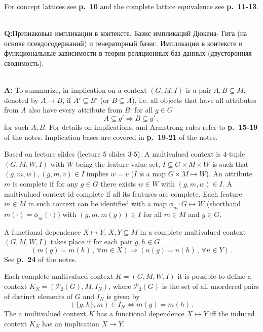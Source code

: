 \documentclass[a4paper,14pt]{extarticle}
\newcommand{\rus}[1]{\foreignlanguage{russian}{#1}}
\begin{document}
\noindent For concept lattices see \textbf{p.~10} and the complete lattice equivalence
see \textbf{p.~11-13}.

\hfill\\\textbf{Q:}\rus{Признаковые импликации в контексте. Базис импликаций Дюкена-
Гига (на основе псевдосодержаний) и генераторный базис. Импликации в контексте и
функциональные зависимости в теории реляционных баз данных (двусторонняя сводимость).}

\hfill\\\textbf{A:}
To summarize, in implication on a context $(G, M, I)$ is a pair $A, B\subseteq M$,
denoted by $A\to B$, if $A'\subseteq B'$ (or $B\subseteq  A$), i.e. all objects that
have all attributes from $A$ also have every attribute from $B$: for all $g\in G$
$$ A\subseteq g' \Rightarrow B \subseteq g'\,, $$
for such $A, B$. For details on implications, and Armstrong rules refer to \textbf{p.~15-19}
of the notes. Implication bases are covered in \textbf{p.~19-21} of the notes.

Based on lecture slides (lecture 5 slides 3-5). A multivalued context is $4$-tuple
$(G, M, W, I)$ with $W$ being the feature value set, $I\subseteq G\times M \times W$
is such that $(g,m,w), (g,m,v)\in I$ implies $w=v$ ($I$ is a map $G\times M\mapsto W$).
An attribute $m$ is complete if for any $g \in G$ there exists $w\in W$ with $(g,m,w)
\in I$. A multivalued context id complete if all its features are complete.
Each feature $m\in M$ in such context can be identified with a map $\phi_m:G\mapsto W$
(shorthand $m(\cdot) = \phi_m(\cdot)$) with $(g, m, m(g))\in I$ for all $m\in M$
and $g\in G$.

A functional dependence $X\mapsto Y$, $X, Y\subseteq M$ in a complete multivalued
context $(G, M, W, I)$ takes place if for each pair $g, h\in G$
$$ (m(g) = m(h)\,,\, \forall m\in X)
    \Rightarrow (n(g) = n(h)\,,\, \forall n\in Y)
    \,. $$
See \textbf{p.~24} of the notes.

Each complete multivalued context $K = (G, M, W, I)$ it is possible to define a context
$K_N = (\mathcal{P}_2(G), M, I_N)$, where $\mathcal{P}_2(G)$ is the set of all unordered
pairs of distinct elements of $G$ and $I_N$ is given by
$$ (\{g, h\}, m) \in I_N
    \Leftrightarrow m(g) = m(h)
    \,. $$
The a multivalued context $K$ has a functional dependence $X\mapsto Y$ iff the induced
context $K_N$ has an implication $X\to Y$.
\end{document}
